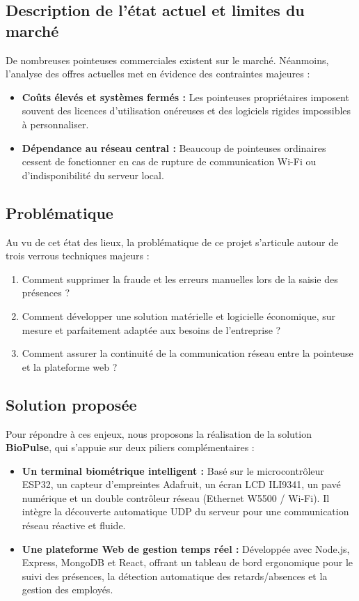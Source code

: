 \documentclass[12pt,a4paper]{report}
\begin{document}
\subsection{Description de l'état actuel et limites du marché}
De nombreuses pointeuses commerciales existent sur le marché. Néanmoins, l'analyse des offres actuelles met en évidence des contraintes majeures :
\begin{itemize}
    \item \textbf{Coûts élevés et systèmes fermés :} Les pointeuses propriétaires imposent souvent des licences d'utilisation onéreuses et des logiciels rigides impossibles à personnaliser.
    \item \textbf{Dépendance au réseau central :} Beaucoup de pointeuses ordinaires cessent de fonctionner en cas de rupture de communication Wi-Fi ou d'indisponibilité du serveur local.
\end{itemize}

\subsection{Problématique}
Au vu de cet état des lieux, la problématique de ce projet s'articule autour de trois verrous techniques majeurs :
\begin{enumerate}
    \item Comment supprimer la fraude et les erreurs manuelles lors de la saisie des présences ?
    \item Comment développer une solution matérielle et logicielle économique, sur mesure et parfaitement adaptée aux besoins de l'entreprise ?
    \item Comment assurer la continuité de la communication réseau entre la pointeuse et la plateforme web ?
\end{enumerate}

\subsection{Solution proposée}
Pour répondre à ces enjeux, nous proposons la réalisation de la solution \textbf{BioPulse}, qui s'appuie sur deux piliers complémentaires :
\begin{itemize}
    \item \textbf{Un terminal biométrique intelligent :} Basé sur le microcontrôleur ESP32, un capteur d'empreintes Adafruit, un écran LCD ILI9341, un pavé numérique et un double contrôleur réseau (Ethernet W5500 / Wi-Fi). Il intègre la découverte automatique UDP du serveur pour une communication réseau réactive et fluide.
    \item \textbf{Une plateforme Web de gestion temps réel :} Développée avec Node.js, Express, MongoDB et React, offrant un tableau de bord ergonomique pour le suivi des présences, la détection automatique des retards/absences et la gestion des employés.
\end{itemize}
\end{document}
